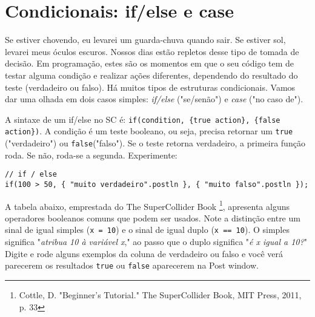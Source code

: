 \section{Condicionais: if/else e case}

Se estiver chovendo, eu levarei um guarda-chuva quando sair. Se estiver sol, levarei meus óculos escuros. Nossos dias estão repletos desse tipo de tomada de decisão. Em programação, estes são os momentos em que o seu código tem de testar alguma condição e realizar ações diferentes, dependendo do resultado do teste (verdadeiro ou falso). Há muitos tipos de estruturas condicionais. Vamos dar uma olhada em dois casos simples: \emph{if/else} ("se/senão") e \emph{case} ("no caso de").

A sintaxe de um if/else no SC é: \texttt{if(condition, \{true action\}, \{false action\})}. A condição é um teste booleano, ou seja, precisa retornar um \texttt{true} ("verdadeiro") ou \texttt{false}("falso"). Se o teste retorna verdadeiro, a primeira função roda. Se não, roda-se a segunda. Experimente:

\begin{lstlisting}[style=SuperCollider-IDE, basicstyle=\scttfamily\footnotesize]
// if / else 
if(100 > 50, { "muito verdadeiro".postln }, { "muito falso".postln });
\end{lstlisting}

A tabela abaixo, emprestada do The SuperCollider Book \footnote{Cottle, D. "Beginner's Tutorial." The SuperCollider Book, MIT Press, 2011, p. 33}, apresenta alguns operadores booleanos comuns que podem ser usados.
Note a distinção entre um sinal de igual simples (\texttt{x = 10}) e o sinal de igual duplo (\texttt{x == 10}). O simples significa "\textit{atribua 10 à variável x}," ao passo que o duplo significa "\textit{é x igual a 10?}" Digite e rode alguns exemplos da coluna de verdadeiro ou falso e você verá parecerem os resultados \texttt{true} ou  \texttt{false} aparecerem na Post window.
 
